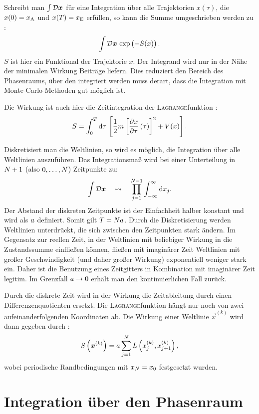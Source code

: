 Schreibt man $\int \mathcal D \boldsymbol{x}$ für eine Integration über alle
Trajektorien $x(\tau)$, die $x(0) = x_\text A$ und $x(T) = x_\text E$ erfüllen,
so kann die Summe umgeschrieben werden zu
\parencite[(2.1)]{Creutz/Statistical_Approach_QM}:
\[
    \int \funcmeasure \, \exp\del{-S(x)}.
\]
$S$ ist hier ein Funktional der Trajektorie $x$. Der Integrand wird nur in der
Nähe der minimalen Wirkung Beiträge liefern. Dies reduziert den Bereich des
Phasenraums, über den integriert werden muss derart, dass die Integration mit
Monte-Carlo-Methoden gut möglich ist.

Die Wirkung ist auch hier die Zeitintegration der \textsc{Lagrange}funktion
\parencite[(2.5)]{Creutz/Statistical_Approach_QM}:
\[
    S = \int_0^T \dif \tau \, \sbr{\frac 12 m \sbr{\dpd x\tau(\tau)}^2 + V(x)}.
\]

Diskretisiert man die Weltlinien, so wird es möglich, die Integration über alle
Weltlinien auszuführen. Das Integrationsmaß wird bei einer Unterteilung in
$N+1$ (also $0, \ldots, N$) Zeitpunkte zu:
\[
    \int \funcmeasure
    \quad\leadsto\quad
    \prod_{j = 1}^{\timesites-1} \int_{-\infty}^\infty \dif x_j.
\]
Der Abstand der diskreten Zeitpunkte ist der Einfachheit halber konstant und
wird als $a$ definiert. Somit gilt $T = Na$. Durch die
Diskretisierung werden Weltlinien unterdrückt, die sich zwischen den
Zeitpunkten stark ändern. Im Gegensatz zur reellen Zeit, in der Weltlinien mit
beliebiger Wirkung in die Zustandssumme einfließen können, fließen mit
imaginärer Zeit Weltlinien mit großer Geschwindigkeit (und daher großer
Wirkung) exponentiell weniger stark ein. Daher ist die Benutzung eines
Zeitgitters in Kombination mit imaginärer Zeit legitim. Im Grenzfall $a
\to 0$ erhält man den kontinuierlichen Fall zurück.

Durch die diskrete Zeit wird in der Wirkung die Zeitableitung durch einen
Differenzenquotienten ersetzt. Die \textsc{Lagrange}funktion hängt nur noch von
zwei aufeinanderfolgenden Koordinaten ab. Die Wirkung einer Weltlinie $\vec
x^{(k)}$ wird dann gegeben durch
\parencite[(3.2)]{Creutz/Statistical_Approach_QM}:
\[
    S\del{\vec x^{(k)}} = \timestep \sum_{j = 1}^\timesites L\del{x_j^{(k)},
    x_{j+1}^{(k)}},
\]
wobei periodische Randbedingungen mit $x_{N} = x_0$ festgesetzt wurden.

\section{Integration über den Phasenraum}

